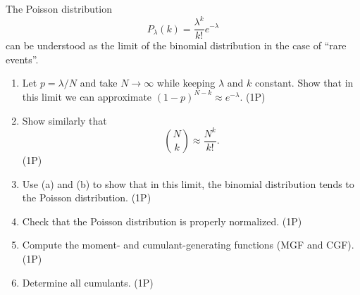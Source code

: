 \begin{Problem}
	The Poisson distribution
	\[
	P_\lambda(k) = \frac{\lambda^k}{k!} e^{-\lambda}
	\]
	can be understood as the limit of the binomial distribution in the case of ``rare events''.
	
	\begin{enumerate}
		\item[(a)] Let $p = \lambda/N$ and take $N \to \infty$ while keeping $\lambda$ and $k$ constant. Show that in this limit we can approximate $(1-p)^{N-k} \approx e^{-\lambda}$. (1P)
		\item[(b)] Show similarly that
		\[
		\binom{N}{k} \approx \frac{N^k}{k!}.
		\]
		(1P)
		\item[(c)] Use (a) and (b) to show that in this limit, the binomial distribution tends to the Poisson distribution. (1P)
		\item[(d)] Check that the Poisson distribution is properly normalized. (1P)
		\item[(e)] Compute the moment- and cumulant-generating functions (MGF and CGF). (1P)
		\item[(f)] Determine all cumulants. (1P)
	\end{enumerate}
\end{Problem}
